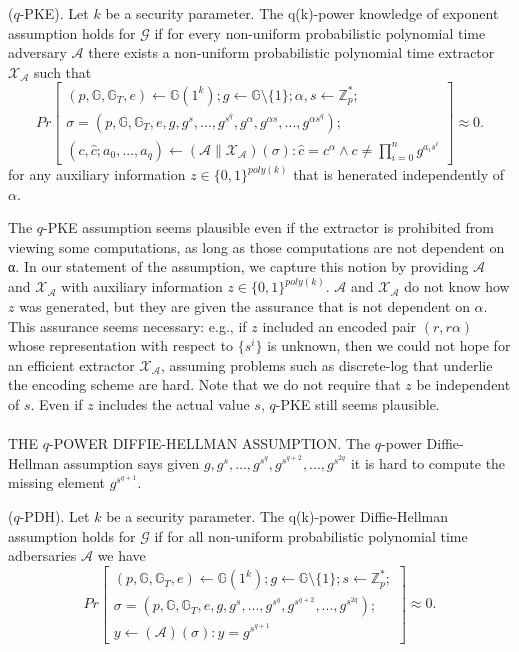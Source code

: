 \documentclass[lnbip]{svmultln}
\begin{document}
\begin{definition} {\rm($q$-PKE).}
Let $k$ be a security parameter. The q(k)-power knowledge of exponent assumption holds for $\mathcal{G}$ if for every non-uniform probabilistic polynomial time adversary $\mathcal{A}$ there exists a non-uniform probabilistic polynomial time extractor $\mathcal{X}_\mathcal{A}$ such that
$$Pr\left[ \begin{array}{lcl} 
(p,\mathbb{G},\mathbb{G}_T,e) \leftarrow \mathcal{\mathbb{G}}(1^k); g \leftarrow \mathbb{G} \setminus\{1\};\alpha,s \leftarrow \mathbb{Z}_p^*;\\
\sigma = (p,\mathbb{G},\mathbb{G}_T,e,g,g^s,...,g^{s^q},g^\alpha,g^{\alpha s},...,g^{\alpha s^q});\\
(c,\hat{c};a_0,...,a_q) \leftarrow (\mathcal{A}\parallel\mathcal{X}_\mathcal{A})(\sigma):\hat{c}=c^\alpha \wedge c \neq \prod\limits_{i=0}^{n}g^{{a_i}{s^i}}
\end{array}\right]\approx 0.$$
for any auxiliary information $z \in \{0,1\}^{poly(k)}$ that is henerated independently of $\alpha$.
\end{definition}

The $q$-PKE assumption seems plausible even if the extractor is prohibited from viewing some computations, as long as those computations are not dependent on α. In our statement of the assumption, we capture this notion by providing $\mathcal{A}$ and $\mathcal{X}_\mathcal{A}$ with auxiliary information $z \in \{0,1\}^{poly(k)}$. $\mathcal{A}$ and $\mathcal{X}_\mathcal{A}$ do not know how $z$ was generated, but they are given the assurance that is not dependent on $\alpha$. This assurance seems necessary: e.g., if $z$ included an encoded pair $(r,r\alpha)$ whose representation with respect to $\{s^i\}$ is unknown, then we could not hope for an efficient extractor $\mathcal{X}_\mathcal{A}$, assuming problems such as discrete-log that underlie the encoding scheme are hard. Note that we do not require that $z$ be independent of $s$. Even if $z$ includes the actual value $s$, $q$-PKE still seems plausible.\\ \\
THE $q$-POWER DIFFIE-HELLMAN ASSUMPTION. The $q$-power Diffie-Hellman assumption says given $g,g^s,...,g^{s^q},g^{s^{q+2}},...,g^{s^{2q}}$ it is hard to compute the missing element $g^{s^{q+1}}$.

\begin{definition} {\rm($q$-PDH).}
Let $k$ be a security parameter. The q(k)-power Diffie-Hellman assumption holds for $\mathcal{G}$ if for all non-uniform probabilistic polynomial time adbersaries $\mathcal{A}$ we have
$$Pr\left[ \begin{array}{lcl} 
(p,\mathbb{G},\mathbb{G}_T,e) \leftarrow \mathcal{\mathbb{G}}(1^k); g \leftarrow \mathbb{G} \setminus\{1\}; s \leftarrow \mathbb{Z}_p^*;\\
\sigma = (p,\mathbb{G},\mathbb{G}_T,e,g,g^s,...,g^{s^q},g^{s^{q+2}},...,g^{s^{2q}});\\
y \leftarrow (\mathcal{A})(\sigma):y=g^{s^{q+1}}
\end{array}\right]\approx 0.$$
\end{definition}
\end{document}
